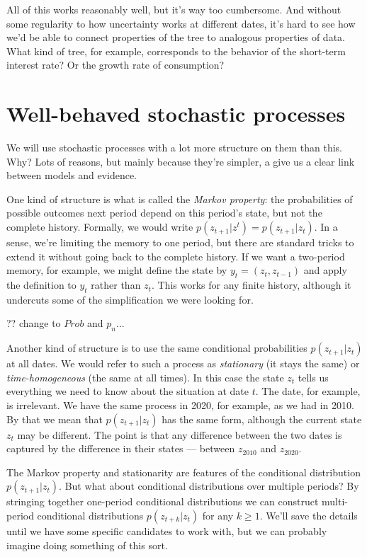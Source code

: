 \documentclass[11pt]{article}
\begin{document}
All of this works reasonably well, but it's way too cumbersome.
And without some regularity to how uncertainty works at different dates,
it's hard to see how we'd be able to connect properties of the tree
to analogous properties of data.
What kind of tree, for example, corresponds to the behavior of the short-term
interest rate?  Or the growth rate of consumption?


\section{Well-behaved stochastic processes}


We will use stochastic processes with a lot more structure
on them than this.
Why?  Lots of reasons, but mainly because they're simpler,
a give us a clear link between models and evidence.

One kind of structure is what is called the {\it Markov property\/}:
the probabilities of possible outcomes next period
depend on this period's state, but not the complete history.
Formally, we would write
$p(z_{t+1} | z^t ) = p(z_{t+1} | z_t ) $.
In a sense, we're limiting the memory to one period,
but there are standard tricks to extend it without going back to the complete history.
If we want a two-period memory, for example, we might define the state by
$y_t = (z_t, z_{t-1})$ and apply the definition to
$y_t$ rather than $z_t$.
This works for any finite history, although it undercuts some
of the simplification we were looking for.

?? change to $Prob$ and $p_n$...

Another kind of structure is to use the same conditional
probabilities $p(z_{t+1} | z_t)$ at all dates.
We would refer to such a process as {\it stationary\/}
(it stays the same) or
{\it time-homogeneous\/} (the same at all times).
In this case the state $z_t$ tells us everything we need to know
about the situation at date $t$.
The date, for example, is irrelevant.
We have the same process in 2020, for example, as we had in 2010.
By that we mean that $p(z_{t+1}|z_t)$ has the same form,
although the current state $z_t$ may be different.
The point is that any difference between the two dates is captured
by the difference in their states --- between $z_{2010}$ and $z_{2020}$.

The Markov property and stationarity
are features of the conditional distribution $p(z_{t+1} | z_t) $.
But what about conditional distributions over multiple periods?
By stringing together one-period conditional distributions
we can construct multi-period conditional distributions
$p(z_{t+k} | z_t) $ for any $k \geq 1$.
We'll save the details until we have some specific candidates to work
with, but we can probably imagine doing something of this sort.
\end{document}
